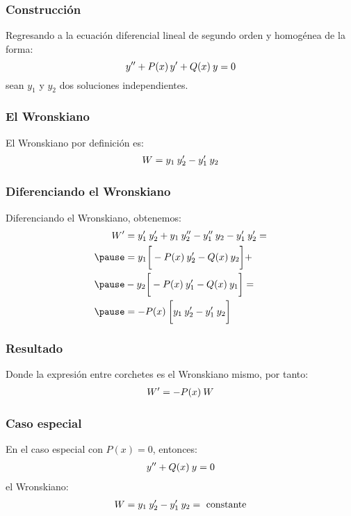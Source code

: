 \documentclass[12pt]{beamer}
\begin{document}
\begin{frame}
\frametitle{Construcción}
Regresando a la ecuación diferencial lineal de segundo orden y homogénea de la forma:
\pause
\begin{equation}
{y}^{\prime \prime} + P (x) \, {y}^{\prime} + Q (x) \: y = 0
\label{eq:ecuacion_09_118}
\end{equation}
sean $y_{1}$ y $y_{2}$ dos soluciones independientes.
\end{frame}
\begin{frame}
\frametitle{El Wronskiano}
El Wronskiano por definición es:
\pause
\begin{align}
W = y_{1} \: {y}^{\prime}_{2} - {y}^{\prime}_{1} \: y_{2}
\label{eq:ecuacion_09_119}
\end{align}
\end{frame}
\begin{frame}
\frametitle{Diferenciando el Wronskiano}
Diferenciando el Wronskiano, obtenemos:
\pause
\begin{eqnarray*}
\begin{aligned}
\ptilde{W} &= \ptilde{y}_{1} \: \ptilde{y}_{2} + y_{1} \: \stilde{y}_{2} - \stilde{y}_{1} \: y_{2} - \ptilde{y}_{1} \: \ptilde{y}_{2} = \\ \pause
&= y_{1} \bigg[ - P(x) \: \ptilde{y}_{2} - Q(x) \: y_{2} \bigg] + \\ \pause
&- y_{2} \bigg[ - P(x) \: \ptilde{y}_{1} - Q(x)  \: y_{1} \bigg] = \\ \pause
&= - P(x) \: \bigg[ y_{1} \: \ptilde{y}_{2} - \ptilde{y}_{1} \: y_{2} \bigg]
\end{aligned}
\end{eqnarray*}
\end{frame}
\begin{frame}
\frametitle{Resultado}
Donde la expresión entre corchetes es el Wronskiano mismo, por tanto:
\pause
\begin{align}
{W}^{\prime} = - P(x) \: W
\label{eq:ecuacion_09_120}
\end{align}
\end{frame}
\begin{frame}
\frametitle{Caso especial}
En el caso especial con $P(x) = 0$, entonces:
\pause
\begin{align}
{y}^{\prime \prime} + Q(x) \: y = 0
\label{eq:ecuacion_09_121}
\end{align}
el Wronskiano:
\pause
\begin{align}
W = y_{1} \: {y}^{\prime}_{2} - {y}^{\prime}_{1} \: y_{2} = \mbox{ constante}
\label{eq:ecuacion_09_1202}
\end{align}
\end{frame}
\end{document}
